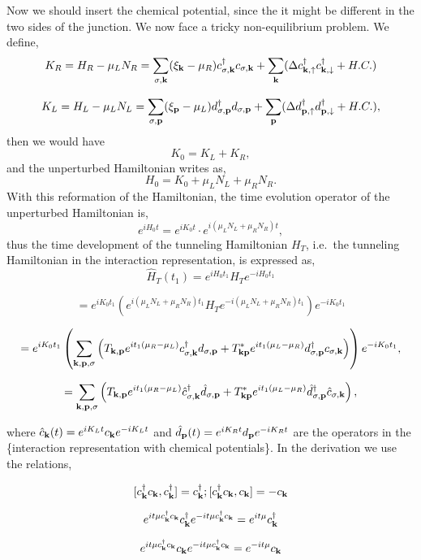 \documentclass[11pt]{article}
\begin{document}
    Now we should insert the chemical potential, since the it might be
different in the two sides of the junction. We now face a tricky
non-equilibrium problem. We define, \[
K_R=H_R-\mu_L N_R=\sum_{\sigma,{\bf k}}(\xi_{\bf k}-\mu_R)
c^{\dagger}_{\sigma,{\bf k}}c_{\sigma,{\bf k}}+\sum_{{\bf k}}
(\Delta c^{\dagger}_{{\bf k},\uparrow}c^{\dagger}_{{\bf
k},\downarrow}+H.C.)
\]

\[K_L=H_L-\mu_L N_L=\sum_{\sigma,{\bf p}}(\xi_{\bf p}-\mu_L)
d^{\dagger}_{\sigma,{\bf p}}d_{\sigma,{\bf p}}+\sum_{{\bf p}}
(\Delta d^{\dagger}_{{\bf p},\uparrow}d^{\dagger}_{{\bf
p},\downarrow}+H.C.),
\] then we would have \[
K_0=K_L+K_R,
\] and the unperturbed Hamiltonian writes as, \[
H_0=K_0+\mu_L N_L+\mu_R N_R.
\] With this reformation of the Hamiltonian, the time evolution operator
of the unperturbed Hamiltonian is, \[
e^{iH_0t}=e^{iK_0t}\cdot e^{i(\mu_L N_L+\mu_R N_R)t},
\] thus the time development of the tunneling Hamiltonian \(H_T\),
i.e.~the tunneling Hamiltonian in the interaction representation, is
expressed as, \[
\hat H_T(t_1) =e^{iH_0t_1}H_Te^{-iH_0t_1}
\]

\[=e^{iK_0t_1}\left(e^{i(\mu_L N_L+\mu_R
N_R)t_1}H_Te^{-i(\mu_L N_L+\mu_R N_R)t_1}\right)e^{-iK_0t_1}
\]

\[
=e^{iK_0t_1}\left(\sum_{{\bf k},{\bf p},\sigma}\left(T_{{\bf k},{\bf p}} e^{it_1(\mu_R-\mu_L)}c^{\dagger}_{\sigma,{\bf k}}d_{\sigma,{\bf
p}}+T^*_{{\bf k}{\bf p}}e^{it_1(\mu_L-\mu_R)}d^{\dagger}_{\sigma,\bf
p} c_{\sigma, \bf k}\right)\right)e^{-iK_0t_1},
\]

\[
= \sum_{{\bf k},{\bf p},\sigma}\left(T_{{\bf k},{\bf p}} e^{it_1(\mu_R-\mu_L)} \hat c^{\dagger}_{\sigma,{\bf k}} \hat d_{\sigma,{\bf
p}}+T^*_{{\bf k}{\bf p}}e^{it_1(\mu_L-\mu_R)} \hat d^{\dagger}_{\sigma,\bf
p} \hat c_{\sigma, \bf k}\right),
\]

where \(\hat c_{\bf k}(t)=e^{i K_L t}c_{\bf k}e^{-i K_L t}\) and
\(\hat d_{\bf p}(t)=e^{i K_R t}d_{\bf p}e^{-i K_R t}\) are the operators
in the \{\pb interaction representation with chemical potentials\}. In
the derivation we use the relations,

\[
[c^{\dagger}_{{\bf k}}c_{{\bf k}},c^{\dagger}_{{\bf
k}}]=c^{\dagger}_{{\bf k}};[c^{\dagger}_{{\bf k}}c_{{\bf k}},c_{{\bf
k}}]=-c_{{\bf k}}
\]

\[
e^{it \mu c^{\dagger}_{{\bf k}}c_{{\bf k}}}c^{\dagger}_{{\bf
k}}e^{-it \mu c^{\dagger}_{{\bf k}}c_{{\bf k}}}=e^{it
\mu}c^{\dagger}_{{\bf k}}
\]

\[
e^{it \mu c^{\dagger}_{{\bf k}}c_{{\bf
k}}}c_{{\bf k}}e^{-it \mu c^{\dagger}_{{\bf k}}c_{{\bf k}}}=e^{-it
\mu}c_{{\bf k}}
\]
\end{document}
